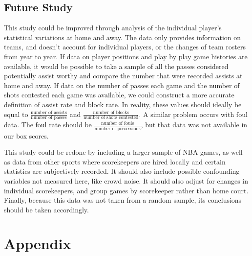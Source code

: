 \documentclass{article}
\begin{document}
\subsection{Future Study}
This study could be improved through analysis of the individual player's statistical variations at home and away. The data only provides information on teams, and doesn't account for individual players, or the changes of team rosters from year to year. If data on player positions and play by play game histories are available, it would be possible to take a sample of all the passes considered potentially assist worthy and compare the number that were recorded assists at home and away. If data on the number of passes each game and the number of shots contested each game was available, we could construct a more accurate definition of assist rate and block rate. In reality, these values should ideally be equal to $\frac{\text{number of assists}}{\text{number of passes}}$ and $\frac{\text{number of blocks}}{\text{number of shots contested}}$. A similar problem occurs with foul data. The foul rate should be $\frac{\text{number of fouls}}{\text{number of possessions}}$, but that data was not available in our box scores. \par This study could be redone by including a larger sample of NBA games, as well as data from other sports where scorekeepers are hired locally and certain statistics are subjectively recorded. It should also include possible confounding variables not measured here, like crowd noise. It should also adjust for changes in individual scorekeepers, and group games by scorekeeper rather than home court. Finally, because this data was not taken from a random sample, its conclusions should be taken accordingly. 


\section{Appendix}
\end{document}
